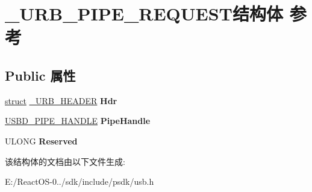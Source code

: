 \hypertarget{struct___u_r_b___p_i_p_e___r_e_q_u_e_s_t}{}\section{\+\_\+\+U\+R\+B\+\_\+\+P\+I\+P\+E\+\_\+\+R\+E\+Q\+U\+E\+S\+T结构体 参考}
\label{struct___u_r_b___p_i_p_e___r_e_q_u_e_s_t}
\subsection*{Public 属性}
\begin{DoxyCompactItemize}
\item 
\mbox{\label{struct___u_r_b___p_i_p_e___r_e_q_u_e_s_t_a2fb579bd3ade59d21fdd855a15f9767c}} 
\hyperlink{interfacestruct}{struct} \hyperlink{struct___u_r_b___h_e_a_d_e_r}{\+\_\+\+U\+R\+B\+\_\+\+H\+E\+A\+D\+ER} {\bfseries Hdr}
\item 
\mbox{\label{struct___u_r_b___p_i_p_e___r_e_q_u_e_s_t_afdfd9670eec779ccd0b3095141bd9869}} 
\hyperlink{interfacevoid}{U\+S\+B\+D\+\_\+\+P\+I\+P\+E\+\_\+\+H\+A\+N\+D\+LE} {\bfseries Pipe\+Handle}
\item 
\mbox{\label{struct___u_r_b___p_i_p_e___r_e_q_u_e_s_t_aa1047a66552eaa29d29aa291951b1f93}} 
U\+L\+O\+NG {\bfseries Reserved}
\end{DoxyCompactItemize}


该结构体的文档由以下文件生成\+:\begin{DoxyCompactItemize}
\item 
E\+:/\+React\+O\+S-\/0../sdk/include/psdk/usb.\+h\end{DoxyCompactItemize}
